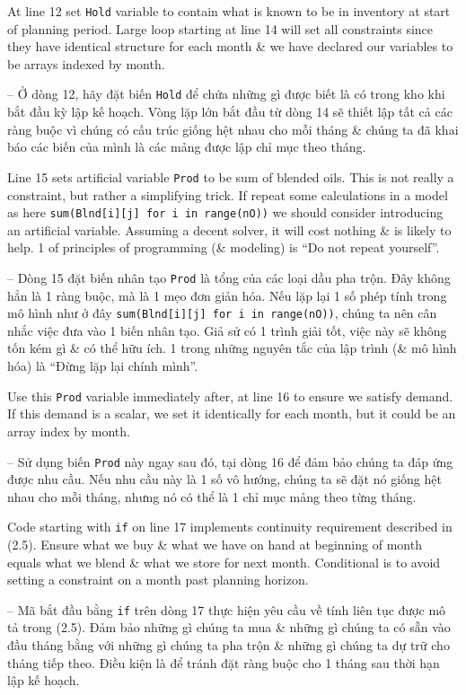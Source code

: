 \documentclass{article}
\begin{document}
\begin{itemize}
\begin{itemize}
\begin{itemize}
\begin{itemize}
                At line 12 set {\tt Hold} variable to contain what is known to be in inventory at start of planning period. Large loop starting at line 14 will set all constraints since they have identical structure for each month \& we have declared our variables to be arrays indexed by month.

                -- Ở dòng 12, hãy đặt biến {\tt Hold} để chứa những gì được biết là có trong kho khi bắt đầu kỳ lập kế hoạch. Vòng lặp lớn bắt đầu từ dòng 14 sẽ thiết lập tất cả các ràng buộc vì chúng có cấu trúc giống hệt nhau cho mỗi tháng \& chúng ta đã khai báo các biến của mình là các mảng được lập chỉ mục theo tháng.

                Line 15 sets artificial variable {\tt Prod} to be sum of blended oils. This is not really a constraint, but rather a simplifying trick. If repeat some calculations in a model as here \verb|sum(Blnd[i][j] for i in range(nO))| we should consider introducing an artificial variable. Assuming a decent solver, it will cost nothing \& is likely to help. 1 of principles of programming (\& modeling) is ``Do not repeat yourself''.

                -- Dòng 15 đặt biến nhân tạo {\tt Prod} là tổng của các loại dầu pha trộn. Đây không hẳn là 1 ràng buộc, mà là 1 mẹo đơn giản hóa. Nếu lặp lại 1 số phép tính trong mô hình như ở đây \verb|sum(Blnd[i][j] for i in range(nO))|, chúng ta nên cân nhắc việc đưa vào 1 biến nhân tạo. Giả sử có 1 trình giải tốt, việc này sẽ không tốn kém gì \& có thể hữu ích. 1 trong những nguyên tắc của lập trình (\& mô hình hóa) là ``Đừng lặp lại chính mình''.

                Use this {\tt Prod} variable immediately after, at line 16 to ensure we satisfy demand. If this demand is a scalar, we set it identically for each month, but it could be an array index by month.

                -- Sử dụng biến {\tt Prod} này ngay sau đó, tại dòng 16 để đảm bảo chúng ta đáp ứng được nhu cầu. Nếu nhu cầu này là 1 số vô hướng, chúng ta sẽ đặt nó giống hệt nhau cho mỗi tháng, nhưng nó có thể là 1 chỉ mục mảng theo từng tháng.

                Code starting with {\tt if} on line 17 implements continuity requirement described in (2.5). Ensure what we buy \& what we have on hand at beginning of month equals what we blend \& what we store for next month. Conditional is to avoid setting a constraint on a month past planning horizon.

                -- Mã bắt đầu bằng {\tt if} trên dòng 17 thực hiện yêu cầu về tính liên tục được mô tả trong (2.5). Đảm bảo những gì chúng ta mua \& những gì chúng ta có sẵn vào đầu tháng bằng với những gì chúng ta pha trộn \& những gì chúng ta dự trữ cho tháng tiếp theo. Điều kiện là để tránh đặt ràng buộc cho 1 tháng sau thời hạn lập kế hoạch.


\end{itemize}
\end{itemize}
\end{itemize}
\end{itemize}
\end{document}
